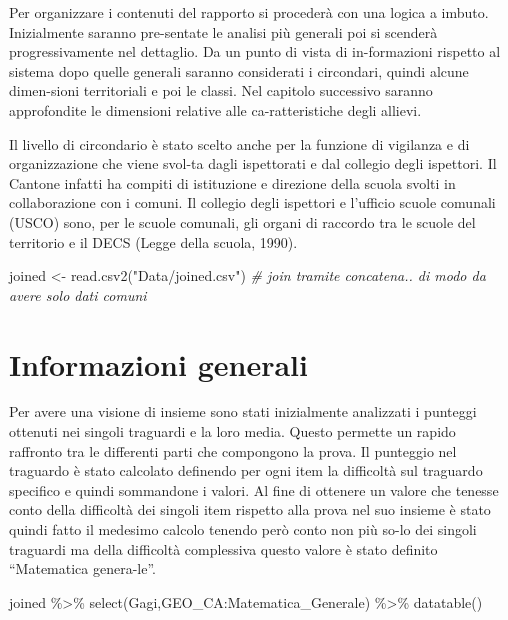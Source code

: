 \documentclass[
]{book}
\newenvironment{Shaded}{\begin{snugshade}}{\end{snugshade}}
\newcommand{\CommentTok}[1]{\textcolor[rgb]{0.56,0.35,0.01}{\textit{#1}}}
\newcommand{\FunctionTok}[1]{\textcolor[rgb]{0.00,0.00,0.00}{#1}}
\newcommand{\NormalTok}[1]{#1}
\newcommand{\OtherTok}[1]{\textcolor[rgb]{0.56,0.35,0.01}{#1}}
\newcommand{\SpecialCharTok}[1]{\textcolor[rgb]{0.00,0.00,0.00}{#1}}
\newcommand{\StringTok}[1]{\textcolor[rgb]{0.31,0.60,0.02}{#1}}
\begin{document}
Per organizzare i contenuti del rapporto si procederà con una logica a imbuto. Inizialmente saranno pre-sentate le analisi più generali poi si scenderà progressivamente nel dettaglio. Da un punto di vista di in-formazioni rispetto al sistema dopo quelle generali saranno considerati i circondari, quindi alcune dimen-sioni territoriali e poi le classi. Nel capitolo successivo saranno approfondite le dimensioni relative alle ca-ratteristiche degli allievi.

Il livello di circondario è stato scelto anche per la funzione di vigilanza e di organizzazione che viene svol-ta dagli ispettorati e dal collegio degli ispettori. Il Cantone infatti ha compiti di istituzione e direzione della scuola svolti in collaborazione con i comuni. Il collegio degli ispettori e l'ufficio scuole comunali (USCO) sono, per le scuole comunali, gli organi di raccordo tra le scuole del territorio e il DECS (Legge della scuola, 1990).

\begin{Shaded}
\begin{Highlighting}[]
\NormalTok{joined }\OtherTok{\textless{}{-}} \FunctionTok{read.csv2}\NormalTok{(}\StringTok{"Data/joined.csv"}\NormalTok{) }\CommentTok{\# join tramite concatena.. di modo da avere solo dati comuni}
\end{Highlighting}
\end{Shaded}

\hypertarget{informazioni-generali}{%
\section{Informazioni generali}\label{informazioni-generali}}

Per avere una visione di insieme sono stati inizialmente analizzati i punteggi ottenuti nei singoli traguardi e la loro media. Questo permette un rapido raffronto tra le differenti parti che compongono la prova. Il punteggio nel traguardo è stato calcolato definendo per ogni item la difficoltà sul traguardo specifico e quindi sommandone i valori. Al fine di ottenere un valore che tenesse conto della difficoltà dei singoli item rispetto alla prova nel suo insieme è stato quindi fatto il medesimo calcolo tenendo però conto non più so-lo dei singoli traguardi ma della difficoltà complessiva questo valore è stato definito ``Matematica genera-le''.

\begin{Shaded}
\begin{Highlighting}[]
\NormalTok{joined }\SpecialCharTok{\%\textgreater{}\%} \FunctionTok{select}\NormalTok{(Gagi,GEO\_CA}\SpecialCharTok{:}\NormalTok{Matematica\_Generale) }\SpecialCharTok{\%\textgreater{}\%}
  \FunctionTok{datatable}\NormalTok{()}
\end{Highlighting}
\end{Shaded}
\end{document}
